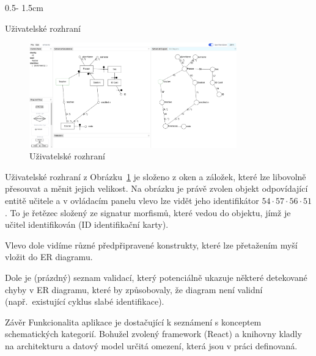 \documentclass[a0paper]{uioposter}
\begin{document}
\begin{frame}
\begin{columns}[onlytextwidth]
    \begin{column}{0.5\textwidth - 1.5cm}
      \begin{block}{Uživatelské rozhraní}
        \begin{figure}
          \centering
          \includegraphics[width=0.8\textwidth]{./images/identifier-screenshot.png}
          \caption{Uživatelské rozhraní}
          \label{fig:user-interface}
        \end{figure}

        Uživatelské rozhraní z Obrázku~\ref{fig:user-interface} je složeno z oken a záložek, které lze libovolně přesouvat a měnit jejich velikost.
        Na obrázku je právě zvolen objekt odpovídající entitě učitele a v ovládacím panelu vlevo lze vidět jeho identifikátor $54\cdot 57\cdot 56\cdot 51$.
        To je řetězec složený ze signatur morfismů, které vedou do objektu, jímž je učitel identifikován (ID identifikační karty).

        Vlevo dole vidíme různé předpřipravené konstrukty, které lze přetažením myší vložit do ER diagramu.

        Dole je (prázdný) seznam validací, který potenciálně ukazuje některé detekované chyby v ER diagramu, které by způsobovaly, že diagram není validní (např.~existující cyklus slabé identifikace).
      \end{block}
      \begin{block}{Závěr}
        Funkcionalita aplikace je dostačující k seznámení s konceptem schematických kategorií.
        Bohužel zvolený framework (React) a knihovny kladly na architekturu a datový model určitá omezení, která jsou v práci definovaná.


\end{block}
\end{column}
\end{columns}
\end{frame}
\end{document}
